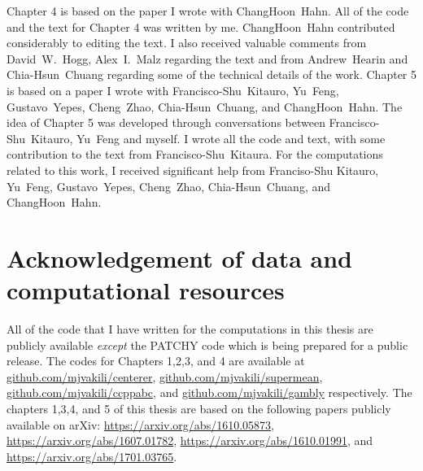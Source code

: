 Chapter 4 is based on the paper I wrote with ChangHoon~Hahn. All of the code and the text for Chapter 4 was written by me. ChangHoon~Hahn contributed considerably to editing the text. I also received valuable comments from David~W.~Hogg, Alex~I.~Malz regarding the text and from Andrew~Hearin and Chia-Hsun~Chuang regarding some of the technical details of the work. Chapter 5 is based on a paper I wrote with Francisco-Shu~Kitauro, Yu~Feng, Gustavo~Yepes, Cheng~Zhao, Chia-Hsun~Chuang, and ChangHoon~Hahn. 
The idea of Chapter 5 was developed through conversations between Francisco-Shu~Kitauro, Yu~Feng and myself. I wrote all the code and text, with some contribution to the text from Francisco-Shu~Kitaura. For the computations related to this work, I received significant help from Franciso-Shu Kitauro, Yu~Feng, Gustavo~Yepes, Cheng~Zhao, Chia-Hsun~Chuang, and ChangHoon~Hahn. 

\section{Acknowledgement of data and computational resources}

All of the code that I have written for the computations in this thesis are publicly available \emph{except} the PATCHY code which is being prepared for a public release. 
The codes for Chapters 1,2,3, and 4 are available at \url{github.com/mjvakili/centerer}, \url{github.com/mjvakili/supermean}, \url{github.com/mjvakili/ccppabc}, and \url{github.com/mjvakili/gambly} respectively. The chapters 1,3,4, and 5 of this thesis are based on the following papers publicly available on arXiv: \url{https://arxiv.org/abs/1610.05873}, \url{https://arxiv.org/abs/1607.01782}, \url{https://arxiv.org/abs/1610.01991}, and \url{https://arxiv.org/abs/1701.03765}.




